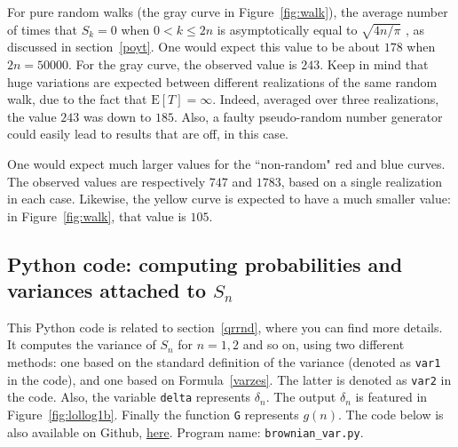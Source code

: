 \documentclass[oneside,10pt]{book}
\begin{document}
For pure random walks (the gray curve in Figure~\ref{fig:walk}), the average number of times that $S_k=0$ when $0<k\leq 2n$
 is asymptotically equal to $\sqrt{4n/\pi}$ , as discussed in section~\ref{poyt}. One would expect this value to be about $178$
 when $2n=\num{50000}$. For the gray curve, the observed value is $243$. Keep in mind that huge variations are expected between different realizations of the same random walk, due to the fact that $\text{E}[T]=\infty$. Indeed, averaged over three realizations, the value $243$ was down to
$185$. Also, a faulty pseudo-random number generator could easily lead to results that are off, in this case.

One would expect much larger
 values for the ``non-random" red and blue curves. The observed
values are respectively $747$ and $1783$, based on a single realization in each case. Likewise, the yellow curve is expected to have a much smaller value: in Figure~\ref{fig:walk},
that value is $105$.

\subsection{Python code: computing probabilities and variances attached to $S_n$}\label{pypy1bv}

This Python code is related to section~\ref{qrrnd}, where you can find more details.
It computes the variance of $S_n$ for $n=1, 2$ and so on, using two different methods:
 one based on the standard definition of the variance (denoted as \texttt{var1} in the code), and one based
 on Formula~\ref{varzes}. The latter is denoted as \texttt{var2} in the code.  Also, the variable \texttt{delta}
 represents $\delta_n$. The output $\delta_n$ is featured in Figure~\ref{fig:lollog1b}.  Finally the function \texttt{G} represents $g(n)$.
The code below is also available on Github, \href{https://github.com/VincentGranville/Machine-Learning/blob/main/Source\%20Code/brownian_var.py}{here}.
Program name: \texttt{brownian\_var.py}. \\

\end{document}
